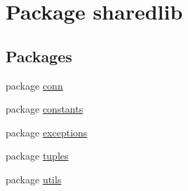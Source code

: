 \hypertarget{namespacesharedlib}{}\section{Package sharedlib}
\label{namespacesharedlib}
\subsection*{Packages}
\begin{DoxyCompactItemize}
\item 
package \hyperlink{namespacesharedlib_1_1conn}{conn}
\item 
package \hyperlink{namespacesharedlib_1_1constants}{constants}
\item 
package \hyperlink{namespacesharedlib_1_1exceptions}{exceptions}
\item 
package \hyperlink{namespacesharedlib_1_1tuples}{tuples}
\item 
package \hyperlink{namespacesharedlib_1_1utils}{utils}
\end{DoxyCompactItemize}
